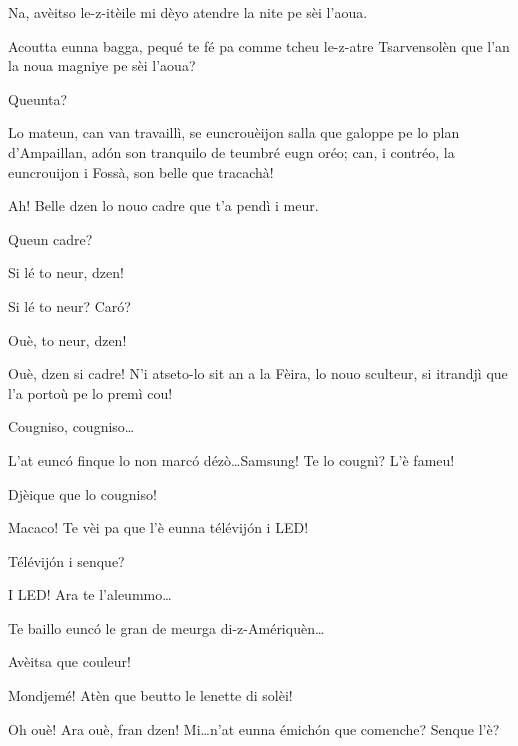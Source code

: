 \begin{drama}
\Vioujspeaks Na, avèitso le-z-itèile mi dèyo atendre la nite pe sèi l'aoua.

\Vioupspeaks Acoutta eunna bagga, pequé te fé pa comme tcheu le-z-atre Tsarvensolèn que l'an la noua magniye pe sèi l'aoua?

\Vioujspeaks Queunta?

\Vioupspeaks Lo mateun, can van travaillì, se euncrouèijon salla que galoppe pe lo plan d'Ampaillan, ad\'on son tranquilo de teumbré eugn oréo; can, i contréo, la euncrouijon i Fossà, son belle que tracachà!

\Vioujspeaks Ah! Belle dzen lo nouo cadre que t'a pendì i meur.

\Vioupspeaks Queun cadre?

\Vioujspeaks Si lé to neur, dzen!

\Vioupspeaks Si lé to neur? Car\'o?

\Vioujspeaks Ouè, to neur, dzen!

\Vioupspeaks Ouè, dzen si cadre! N'i atseto-lo sit an a la Fèira, lo nouo sculteur, si itrandjì que l'a portoù pe lo premì cou!

\Vioujspeaks Cougniso, cougniso\ldots

\Vioupspeaks L'at eunc\'o finque lo non marc\'o dézò\ldots Samsung! Te lo cougnì? L'è fameu!

\Vioujspeaks Djèique que lo cougniso!

\Vioupspeaks Macaco! Te vèi pa que l'è eunna télévij\'on i LED!

\Vioujspeaks{} Télévij\'on i senque?

\Vioupspeaks I LED! Ara te l'aleummo\ldots


\Vioupspeaks Te baillo eunc\'o le gran de meurga di-z-Amériquèn\ldots


\Vioupspeaks Avèitsa que couleur!

\Vioujspeaks Mondjemé! Atèn que beutto le lenette di solèi!


\Vioujspeaks Oh ouè! Ara ouè, fran dzen! Mi\ldots n'at eunna émich\'on que comenche? Senque l'è?


\end{drama}
